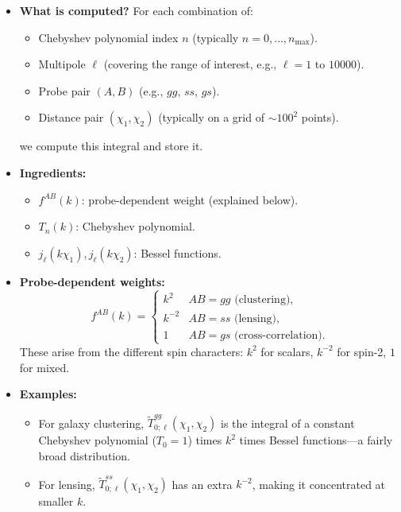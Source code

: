 \begin{itemize}[leftmargin=1.5cm]
    \item \textbf{What is computed?} For each combination of:
    \begin{itemize}
        \item Chebyshev polynomial index $n$ (typically $n=0,\ldots,n_{\max}$).
        \item Multipole $\ell$ (covering the range of interest, e.g., $\ell=1$ to $10000$).
        \item Probe pair $(A,B)$ (e.g., $gg$, $ss$, $gs$).
        \item Distance pair $(\chi_1, \chi_2)$ (typically on a grid of $\sim 100^2$ points).
    \end{itemize}
    we compute this integral and store it.

    \item \textbf{Ingredients:}
    \begin{itemize}
        \item $f^{AB}(k)$: probe-dependent weight (explained below).
        \item $T_n(k)$: Chebyshev polynomial.
        \item $j_\ell(k\chi_1), j_\ell(k\chi_2)$: Bessel functions.
    \end{itemize}

    \item \textbf{Probe-dependent weights:}
    \begin{equation}
        f^{AB}(k) =
        \begin{cases}
            k^2  & AB = gg\text{ (clustering)}, \\
            k^{-2} & AB = ss\text{ (lensing)}, \\
            1    & AB = gs\text{ (cross-correlation)}.
        \end{cases}
    \end{equation}
    These arise from the different spin characters: $k^2$ for scalars, $k^{-2}$ for spin-2, $1$ for mixed.

    \item \textbf{Examples:}
    \begin{itemize}
        \item For galaxy clustering, $\tilde{T}^{gg}_{0;\ell}(\chi_1,\chi_2)$ is the integral of a constant Chebyshev polynomial ($T_0=1$) times $k^2$ times Bessel functions—a fairly broad distribution.
        \item For lensing, $\tilde{T}^{ss}_{0;\ell}(\chi_1,\chi_2)$ has an extra $k^{-2}$, making it concentrated at smaller $k$.
    \end{itemize}
\end{itemize}

